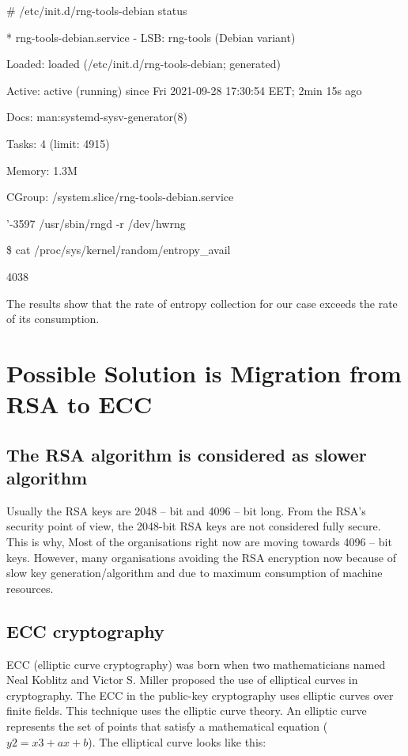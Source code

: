 \documentclass[graybox]{svmult}
\begin{document}
\# /etc/init.d/rng-tools-debian status

* rng-tools-debian.service - LSB: rng-tools (Debian variant)

Loaded: loaded (/etc/init.d/rng-tools-debian; generated)

Active: active (running) since Fri 2021-09-28 17:30:54 EET; 2min 15s ago

Docs: man:systemd-sysv-generator(8)

Tasks: 4 (limit: 4915)

Memory: 1.3M

CGroup: /system.slice/rng-tools-debian.service

'-3597 /usr/sbin/rngd -r /dev/hwrng

\$ cat /proc/sys/kernel/random/entropy\_avail

4038

The results show that the rate of entropy collection for our case exceeds the rate of its consumption.

\section{Possible Solution is Migration from RSA to ECC}
\label{sec:6}

\subsection{The RSA algorithm is considered as slower algorithm}
\label{sub-sec:6-1}

Usually the RSA keys are 2048 – bit and 4096 – bit long. From the RSA's security point of view, the 2048-bit RSA keys are not considered fully secure. This is why, Most of the organisations right now are moving towards 4096 – bit keys. However, many organisations avoiding the RSA encryption now because of slow key generation/algorithm and due to maximum consumption of machine resources.

\subsection{ECC cryptography}
\label{sub-sec:6-2}

ECC (elliptic curve cryptography) was born when two mathematicians named Neal Koblitz and Victor S. Miller proposed the use of elliptical curves in cryptography. The ECC in the public-key cryptography uses elliptic curves over finite fields. This technique uses the elliptic curve theory. An elliptic curve represents the set of points that satisfy a mathematical equation ($y2 = x3 + ax + b$). The elliptical curve looks like this:
\end{document}
